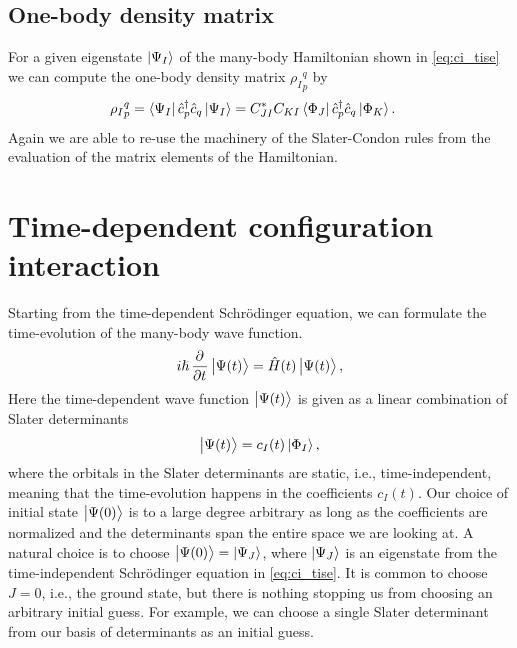         \subsection{One-body density matrix}
            For a given eigenstate $\ket{\Psi_I}$ of the many-body Hamiltonian
            shown in \autoref{eq:ci_tise} we can compute the one-body density
            matrix ${\rho_I}^{q}_{p}$ by
            \begin{align}
                {\rho_I}^{q}_{p}
                &= \bra{\Psi_I}\hat{c}_{p}^{\dagger}\hat{c}_{q}\ket{\Psi_I}
                = C_{JI}^{*}C_{KI}\bra{\Phi_J}\hat{c}_{p}^{\dagger}\hat{c}_{q}\ket{\Phi_K}.
            \end{align}
            Again we are able to re-use the machinery of the Slater-Condon rules
            from the evaluation of the matrix elements of the Hamiltonian.

    \section{Time-dependent configuration interaction}
        Starting from the time-dependent Schrödinger equation, we can formulate
        the time-evolution of the many-body wave function.
        \begin{align}
            i\hslash \dpd[]{}{t}\ket{\Psi(t)}
            = \hamil(t)\ket{\Psi(t)},
            \label{eq:ci_tdse}
        \end{align}
        Here the time-dependent wave function $\ket{\Psi(t)}$ is given as a
        linear combination of Slater determinants
        \begin{align}
            \ket{\Psi(t)} = c_{I}(t) \ket{\Phi_I},
            \label{eq:ci_td_wave}
        \end{align}
        where the orbitals in the Slater determinants are static, i.e.,
        time-independent, meaning that the time-evolution happens in the
        coefficients $c_{I}(t)$.
        Our choice of initial state $\ket{\Psi(0)}$ is to a large degree
        arbitrary as long as the coefficients are normalized and the
        determinants span the entire space we are looking at.
        A natural choice is to choose $\ket{\Psi(0)} = \ket{\Psi_J}$, where
        $\ket{\Psi_J}$ is an eigenstate from the time-independent Schrödinger
        equation in \autoref{eq:ci_tise}.
        It is common to choose $J = 0$, i.e., the ground state, but there is
        nothing stopping us from choosing an arbitrary initial guess.
        For example, we can choose a single Slater determinant from our basis of
        determinants as an initial guess.

